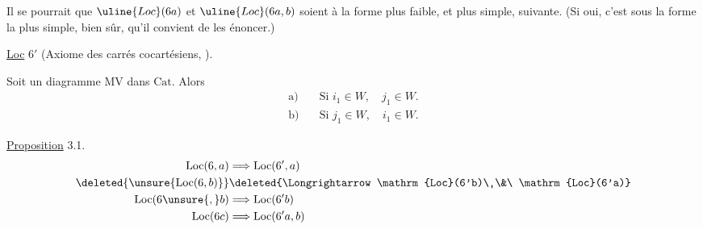Il se pourrait que $\uline{Loc}(6a)$ et $\uline{Loc}(6a,b)$ soient  à la forme plus faible, et plus simple, suivante. (Si oui, c'est sous la forme la plus simple, bien sûr, qu'il convient de les énoncer.)

\uline{Loc} $6'$ (Axiome des carrés cocartésiens, ).

Soit
un diagramme  $\mathrm{MV}$ dans $\mathrm{Cat}$. Alors
\[
\begin{aligned}
\text{a)}\quad&\text{Si } i_1\in W,\quad j_1\in W.\\
\text{b)}\quad&\text{Si } j_1\in W,\quad i_1\in W.
\end{aligned}
\]

\uline{Proposition} 3.1.
\[
\begin{aligned}
\mathrm{Loc}(6,a)&\Longrightarrow\mathrm{Loc}(6',a)\\
\deleted{\unsure{\mathrm{Loc}(6,b)}}&\deleted{\Longrightarrow\mathrm{Loc}(6'b)\ \&\ \mathrm{Loc}(6'a)}\\
\mathrm{Loc}(6\unsure{,}b)&\Longrightarrow\mathrm{Loc}(6'b)\\
\mathrm{Loc}(6c)&\Longrightarrow\mathrm{Loc}(6'a,b)
\end{aligned}
\]

